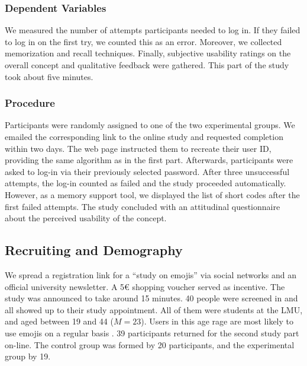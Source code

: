 \subsubsection{Dependent Variables}
We measured the number of attempts participants needed to log in. If they failed to log in on the first try, we counted this as an error.  Moreover, we collected memorization and recall techniques. 
Finally, subjective usability ratings on the overall concept and qualitative feedback were gathered. This part of the study took about five minutes.

\subsubsection{Procedure}
Participants were randomly assigned to one of the two experimental groups. We emailed the corresponding link to the online study and requested completion within two days. 
The web page instructed them to recreate their user ID, providing the same algorithm as in the first part. Afterwards, participants were asked to log-in via their previously selected password. After three unsuccessful attempts, the log-in counted as failed and the study proceeded automatically. However, as a memory support tool, we displayed the list of short codes after the first failed attempts. The study concluded with an attitudinal questionnaire about the perceived usability of the concept. 

\subsection{Recruiting and Demography}
We spread a registration link for a ``study on emojis'' via social networks and an official university newsletter. A 5€ shopping voucher served as incentive. The study was announced to take around 15 minutes. 40 people were screened in and all showed up to their study appointment. All of them were students at the LMU, and aged between 19 and 44 ($M=23$).  %
Users in this age rage are most likely to use emojis on a regular basis \cite{EmogiResearch2016}. 39 participants returned for the second study part on-line. The control group was formed by 20 participants, and the experimental group by 19. 
